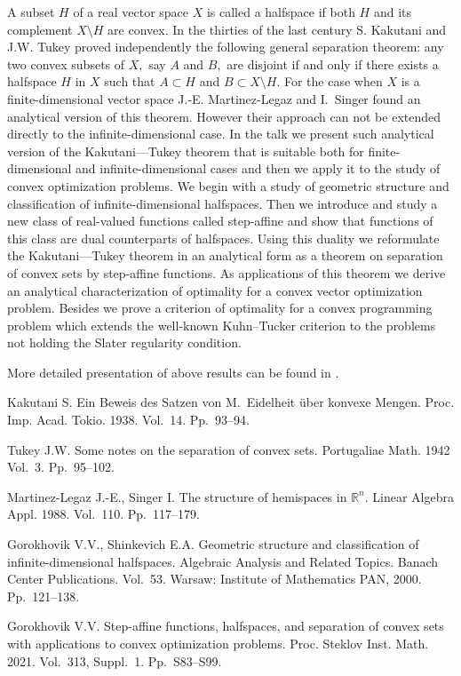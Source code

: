 \documentclass[12pt]{llncs}
\begin{document}
A subset $H$ of a real vector space $X$ is called a halfspace if
both $H$ and its complement $X \setminus H$ are convex. In the
thirties of the last century S. Kakutani \cite{Kakutani} and J.W. Tukey \cite{Tukey} proved
independently the following general separation theorem: any two
convex subsets of $X,$ say $A$ and $B,$  are disjoint if and only
if there exists a halfspace $H$ in $X$ such that $A \subset H$ and
$B \subset {X \setminus H}$. For the case when $X$ is a
finite-dimensional  vector space J.-E. Martinez-Legaz and
I.~Singer \cite{M-L_S88} found an analytical version of this theorem. However
their approach can not be extended directly to the
infinite-dimensional case. In the talk we present such analytical
version of the Kakutani---Tukey theorem that is suitable both for
finite-dimensional and infinite-dimensional cases and then we
apply it to the study of convex optimization problems. We begin
with a study of geometric structure and classification of
infinite-dimensional halfspaces. Then we introduce and study a new
class of real-valued functions called step-affine and show that
functions of this class are dual counterparts of halfspaces. Using
this duality we reformulate the Kakutani---Tukey theorem in an
analytical form as a theorem on separation of convex sets by
step-affine functions. As applications of this theorem we derive
an analytical characterization of optimality for a convex vector
optimization problem. Besides we prove a criterion of optimality
for a convex programming problem which extends the well-known
Kuhn--Tucker criterion to the problems not holding the Slater
regularity condition.

More detailed presentation of above results can be found in \cite{G1,G2}.

%

\begin{thebibliography}{9} %
Kakutani S. Ein Beweis des Satzen von M.~Eidelheit \"{u}ber konvexe Mengen. Proc. Imp. Acad. Tokio. 1938. Vol.~14. Pp.~93--94.

Tukey J.W. Some notes on the separation of convex sets. Portugaliae Math. 1942 Vol.~3. Pp.~95--102.

Martinez-Legaz J.-E., Singer I. The structure of hemispaces in ${\mathbb R}^n$. Linear Algebra Appl. 1988. Vol.~110. Pp.~117--179.

 Gorokhovik V.V., Shinkevich E.A. Geometric structure and classification of infinite-dimensional halfspaces.  Algebraic Analysis and Related Topics. Banach Center Publications. Vol.~53. Warsaw: Institute of Mathematics PAN, 2000. Pp.~121--138.

  Gorokhovik V.V. Step-affine functions, halfspaces, and separation of convex sets with applications to convex optimization problems. Proc. Steklov Inst. Math. 2021. Vol.~313, Suppl.~1. Pp.~S83--S99.
    

\end{thebibliography}

\end{document}
